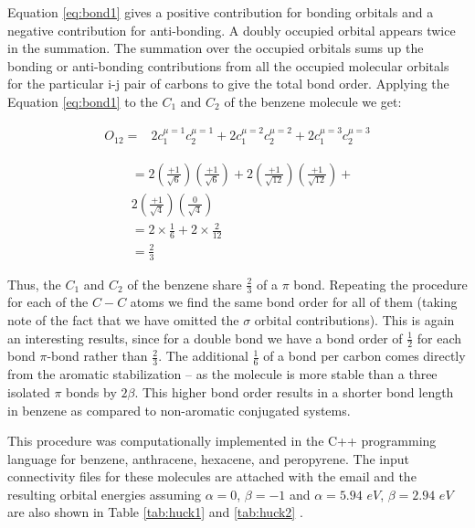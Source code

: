 \documentclass[9pt,twocolumn,twoside]{optica}
\begin{document}
Equation \ref{eq:bond1} gives a positive contribution for bonding orbitals and a
negative contribution for anti-bonding. A doubly occupied orbital appears twice in the summation.  The summation over the occupied orbitals sums up the bonding or anti-bonding contributions from all the occupied molecular orbitals for the particular i-j pair of carbons to give  the total bond order.  Applying the Equation \ref{eq:bond1} to the $C_1$ and $C_2$ of the benzene molecule we get:

\begin{align}
O_{12}=& 2 c_1^{\mu=1} c_2^{\mu=1}+2 c_1^{\mu=2} c_2^{\mu=2}+2 c_1^{\mu=3} c_2^{\mu=3}
\label{eq:bond21}
 \end{align}
 
\begin{align}
& = 2 \left( \frac{+1}{\sqrt{6}} \right) \left( \frac{+1}{\sqrt{6}} \right)+
2 \left( \frac{+1}{\sqrt{12}} \right) \left( \frac{+1}{\sqrt{12}} \right)+ \\
& 2 \left( \frac{+1}{\sqrt{4}} \right) \left( \frac{0}{\sqrt{4}} \right)\\
& = 2 \times \frac{1}{6}+2 \times \frac{2}{12}\\
& =\frac{2}{3}
 \label{eq:bondz}
 \end{align} 

Thus, the $C_1$ and $C_2$ of the benzene share $\frac{2}{3}$ of a $\pi$ bond. Repeating the procedure for each of the $C-C$ atoms we find the same bond order for all of them (taking note of the fact that we have omitted the $\sigma$ orbital contributions). This is again an interesting results, since for a double bond we have a bond order of $\frac{1}{2}$ for each   bond   $\pi$-bond rather than $\frac{2}{3}$. The additional $\frac{1}{6}$ of a bond per carbon comes directly from the aromatic stabilization -- as the molecule is more stable than a three isolated $\pi$ bonds by $2\beta$. This higher bond order results in a shorter  bond length in benzene as compared to non-aromatic conjugated systems.




This procedure was computationally implemented in the  C++ programming language for benzene, anthracene,  hexacene, and  peropyrene. The input connectivity files for these molecules are attached with the email and the resulting orbital energies assuming $\alpha=0 $, $\beta=-1 $ and $\alpha=5.94 \,\, eV $, $\beta=2.94 \,\, eV $ are also shown in Table \ref{tab:huck1} and \ref{tab:huck2} .
\end{document}
